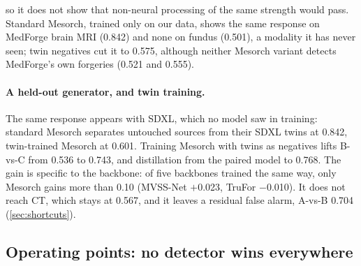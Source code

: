 so it does not show that non-neural processing of the same strength would pass. 
Standard Mesorch, trained only on our data, shows the same response on MedForge brain MRI (0.842) %
and none on fundus (0.501), a modality it has never seen; %
twin negatives cut it to 0.575, %
although neither Mesorch variant detects MedForge's own forgeries (0.521 and 0.555). %

\paragraph{A held-out generator, and twin training.}
The same response appears with SDXL, which no model saw in training: standard Mesorch separates untouched sources from their SDXL twins at 0.842, %
twin-trained Mesorch at 0.601. %
Training Mesorch with twins as negatives lifts B-vs-C from 0.536 to 0.743, %
and distillation from the paired model to 0.768. %
The gain is specific to the backbone: of five backbones trained the same way, only Mesorch gains more than 0.10 (MVSS-Net $+$0.023, TruFor $-$0.010). %
It does not reach CT, which stays at 0.567, %
and it leaves a residual false alarm, A-vs-B 0.704 (\cref{sec:shortcuts}). %

\subsection{Operating points: no detector wins everywhere}
\label{sec:operating}

